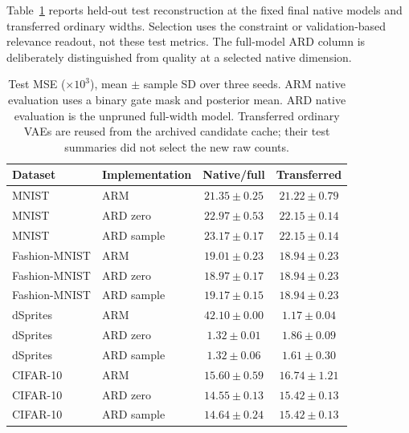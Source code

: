 \documentclass[make,article,submit,pdftex,moreauthors]{Definitions/mdpi}
\begin{document}
Table~\ref{tab:newtest} reports held-out test reconstruction at the
fixed final native models and transferred ordinary widths. Selection
uses the constraint or validation-based relevance readout, not these
test metrics. The full-model ARD column is deliberately distinguished
from quality at a selected native dimension.
\begin{table}[H]
\caption{Test MSE ($\times10^3$), mean $\pm$ sample SD over three seeds. ARM native evaluation uses a binary gate mask and posterior mean. ARD native evaluation is the unpruned full-width model. Transferred ordinary VAEs are reused from the archived candidate cache; their test summaries did not select the new raw counts.}\label{tab:newtest}
\small
\setlength{\tabcolsep}{3pt}
\begin{tabular*}{\textwidth}{@{\extracolsep{\fill}}llcc@{}}
\toprule
Dataset & Implementation & Native/full & Transferred \\
\midrule
MNIST & ARM & $21.35 \pm 0.25$ & $21.22 \pm 0.79$ \\
MNIST & ARD zero & $22.97 \pm 0.53$ & $22.15 \pm 0.14$ \\
MNIST & ARD sample & $23.17 \pm 0.17$ & $22.15 \pm 0.14$ \\
Fashion-MNIST & ARM & $19.01 \pm 0.23$ & $18.94 \pm 0.23$ \\
Fashion-MNIST & ARD zero & $18.97 \pm 0.17$ & $18.94 \pm 0.23$ \\
Fashion-MNIST & ARD sample & $19.17 \pm 0.15$ & $18.94 \pm 0.23$ \\
dSprites & ARM & $42.10 \pm 0.00$ & $1.17 \pm 0.04$ \\
dSprites & ARD zero & $1.32 \pm 0.01$ & $1.86 \pm 0.09$ \\
dSprites & ARD sample & $1.32 \pm 0.06$ & $1.61 \pm 0.30$ \\
CIFAR-10 & ARM & $15.60 \pm 0.59$ & $16.74 \pm 1.21$ \\
CIFAR-10 & ARD zero & $14.55 \pm 0.13$ & $15.42 \pm 0.13$ \\
CIFAR-10 & ARD sample & $14.64 \pm 0.24$ & $15.42 \pm 0.13$ \\
\bottomrule\end{tabular*}
\end{table}
\end{document}
